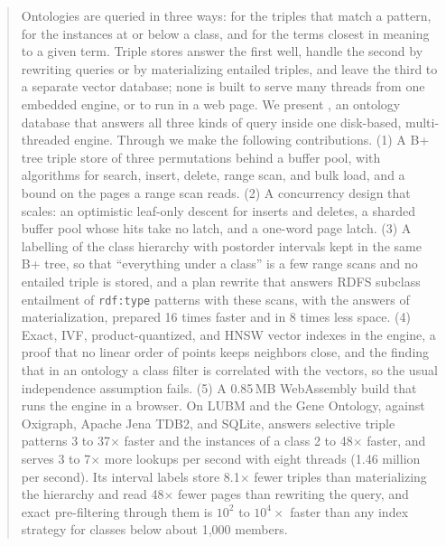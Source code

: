 \begin{abstract}
Ontologies are queried in three ways: for the triples that match a pattern,
for the instances at or below a class, and for the terms closest in meaning
to a given term.
Triple stores answer the first well, handle the second by rewriting queries
or by materializing entailed triples, and leave the third to a separate
vector database; none is built to serve many threads from one embedded
engine, or to run in a web page.
We present \sys, an ontology database that answers all three kinds of query
inside one disk-based, multi-threaded engine.
Through \sys we make the following contributions.
(1) A B+ tree triple store of three permutations behind a buffer pool, with
algorithms for search, insert, delete, range scan, and bulk load, and a bound
on the pages a range scan reads.
(2) A concurrency design that scales: an optimistic leaf-only descent for
inserts and deletes, a sharded buffer pool whose hits take no latch, and a
one-word page latch.
(3) A labelling of the class hierarchy with postorder intervals kept in the
same B+ tree, so that ``everything under a class'' is a few range scans and no
entailed triple is stored, and a plan rewrite that answers RDFS subclass
entailment of \texttt{rdf:type} patterns with these scans, with the answers of
materialization, prepared 16 times faster and in 8 times less space.
(4) Exact, IVF, product-quantized, and HNSW vector indexes in the engine, a
proof that no linear order of points keeps neighbors close, and the finding
that in an ontology a class filter is correlated with the vectors, so the
usual independence assumption fails.
(5) A 0.85\,MB WebAssembly build that runs the engine in a browser.
On LUBM and the Gene Ontology, against Oxigraph, Apache Jena TDB2, and SQLite,
\sys answers selective triple patterns 3 to 37$\times$ faster and the
instances of a class 2 to 48$\times$ faster, and serves 3 to 7$\times$ more
lookups per second with eight threads (1.46 million per second).
Its interval labels store 8.1$\times$ fewer triples than materializing the
hierarchy and read 48$\times$ fewer pages than rewriting the query, and exact
pre-filtering through them is $10^2$ to $10^4\times$ faster than any index
strategy for classes below about 1,000 members.
\end{abstract}
